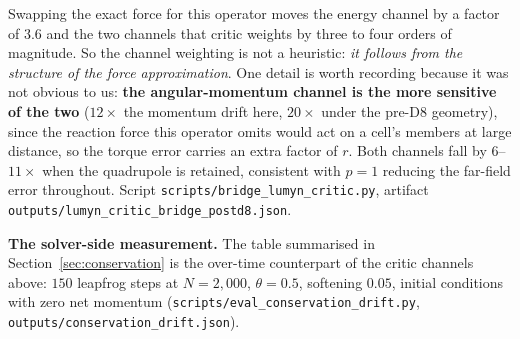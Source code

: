 \begin{center}
\end{center}

\noindent Swapping the exact force for this operator moves the energy channel by a factor of $3.6$
and the two channels that critic weights by three to four orders of magnitude. So the channel weighting
is not a heuristic: \emph{it follows from the structure of the force approximation}. One detail is
worth recording because it was not obvious to us: \textbf{the angular-momentum channel is the more
sensitive of the two} ($12\times$ the momentum drift here, $20\times$ under the pre-D8 geometry), since
the reaction force this operator omits would act on a cell's members at large distance, so the torque
error carries an extra factor of $r$. Both channels fall by $6$--$11\times$ when the quadrupole is
retained, consistent with $p{=}1$ reducing the far-field error throughout. Script
\texttt{scripts/\allowbreak bridge\_\allowbreak lumyn\_\allowbreak critic.\allowbreak py}, artifact
\texttt{outputs/\allowbreak lumyn\_\allowbreak critic\_\allowbreak bridge\_\allowbreak postd8.\allowbreak json}.

\noindent\textbf{The solver-side measurement.} The table summarised in
Section~\ref{sec:conservation} is the over-time counterpart of the critic channels above: $150$
leapfrog steps at $N=2{,}000$, $\theta=0.5$, softening $0.05$, initial conditions with zero net
momentum (\texttt{scripts/\allowbreak eval\_\allowbreak conservation\_\allowbreak drift.\allowbreak py}, \texttt{outputs/\allowbreak conservation\_\allowbreak drift.\allowbreak json}).

